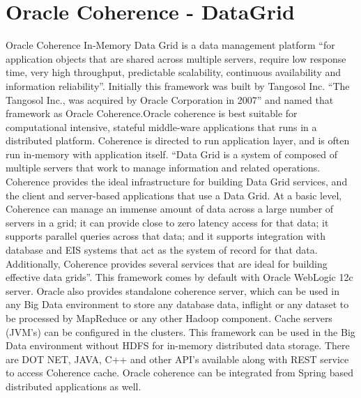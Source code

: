 \section{Oracle Coherence - DataGrid}

Oracle Coherence In-Memory Data Grid is a data management platform “for application objects that are shared across multiple servers, 
require low response time, very high throughput, predictable scalability, 
continuous availability and information reliability”\cite{hid-sp18-514-OracleCoherence}. 
Initially this framework was built by Tangosol Inc. “The Tangosol Inc., 
was acquired by Oracle Corporation in 2007”\cite{hid-sp18-514-coherencewiki} 
and named that framework as Oracle Coherence.Oracle coherence is best suitable for computational intensive, 
stateful middle-ware applications that runs in a distributed platform. 
Coherence is directed to run application layer, and is often run in-memory with application itself. 
“Data Grid is a system of composed of multiple servers that work to manage information and related operations. 
Coherence provides the ideal infrastructure for building Data Grid services, and the client 
and server-based applications that use a Data Grid. 
At a basic level, Coherence can manage an immense amount of data across a large number of servers in a grid; 
it can provide close to zero latency access for that data; it supports parallel queries across that data; 
and it supports integration with database and EIS systems that act as the system of record for that data. Additionally, 
Coherence provides several services that are ideal for building effective data grids”\cite{hid-sp18-514-OracleCoherence}.
This framework comes by default with Oracle WebLogic 12c server. 
Oracle also provides standalone coherence server, which can be used in any Big Data environment to store any database data, 
inflight or any dataset to be processed by MapReduce or any other Hadoop component. 
Cache servers (JVM’s) can be configured in the clusters. 
This framework can be used in the Big Data environment without HDFS for in-memory distributed data storage. There are DOT NET, 
JAVA, C++ and other API’s available along with REST service to access Coherence cache\cite{hid-sp18-514-OracleCoherence}. 
Oracle coherence can be integrated from Spring based distributed applications as well\cite{hid-sp18-514-CoherenceSpringInt}.
